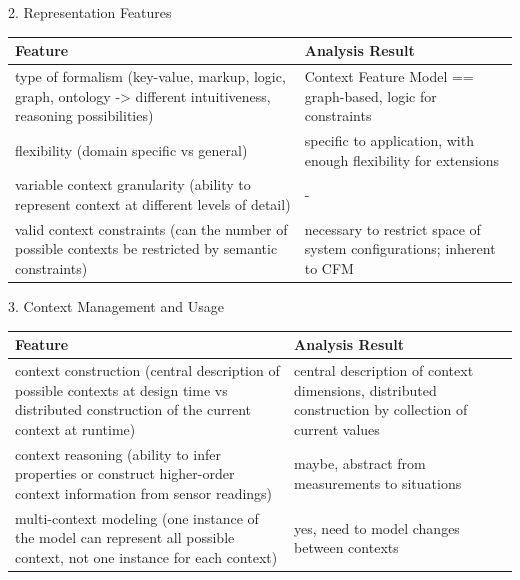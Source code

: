 2. Representation Features \\
\newline
\begin{tabularx}{\textwidth}{|X|X|}
\hline
\textbf{Feature} & \textbf{Analysis Result} \\
\hline 
type of formalism (key-value, markup, logic, graph, ontology -> different intuitiveness, reasoning possibilities)  & Context Feature Model == graph-based, logic for constraints \\ 
\hline 
flexibility (domain specific vs general)  & specific to application, with enough flexibility for extensions \\ 
\hline 
variable context granularity (ability to represent context at different levels of detail) & - \\ 
\hline 
valid context constraints (can the number of possible contexts be restricted by semantic constraints) & necessary to restrict space of system configurations; inherent to CFM \\ 
\hline 
\end{tabularx} 
 
 3. Context Management and Usage \\
\newline
\begin{tabularx}{\textwidth}{|X|X|}
\hline
\textbf{Feature} & \textbf{Analysis Result} \\
\hline 
context construction (central description of possible contexts at design time vs distributed construction of the current context at runtime) &  central description of context dimensions, distributed construction by collection of current values \\ 
\hline 
context reasoning (ability to infer properties or construct higher-order context information from sensor readings) & maybe, abstract from measurements to situations \\ 
\hline 
multi-context modeling (one instance of the model can represent all possible context, not one instance for each context) & yes, need to model changes between contexts \\ 
\hline 
\end{tabularx} 

